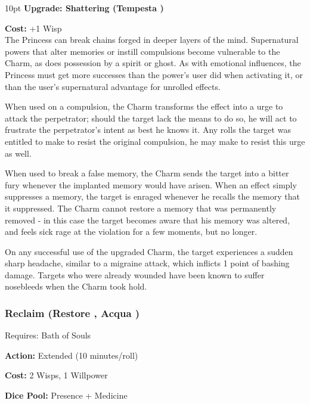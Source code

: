\begin{myindentpar}{10pt} \textbf{Upgrade: Shattering (Tempesta \textbullet\textbullet\textbullet\textbullet)}

\noindent \textbf{Cost:} +1 Wisp \\

\noindent The Princess can break chains forged in deeper layers of the mind. Supernatural powers that alter memories or instill compulsions become vulnerable to the Charm, as does possession by a spirit or ghost. As with emotional influences, the Princess must get more successes than the power's user did when activating it, or than the user's supernatural advantage for unrolled effects.

When used on a compulsion, the Charm transforms the effect into a urge to attack the perpetrator; should the target lack the means to do so, he will act to frustrate the perpetrator's intent as best he knows it. Any rolls the target was entitled to make to resist the original compulsion, he may make to resist this urge as well. 

When used to break a false memory, the Charm sends the target into a bitter fury whenever the implanted memory would have arisen. When an effect simply suppresses a memory, the target is enraged whenever he recalls the memory that it suppressed. The Charm cannot restore a memory that was permanently removed - in this case the target becomes aware that his memory was altered, and feels sick rage at the violation for a few moments, but no longer.

On any successful use of the upgraded Charm, the target experiences a sudden sharp headache, similar to a migraine attack, which inflicts 1 point of bashing damage. Targets who were already wounded have been known to suffer nosebleeds when the Charm took hold.\end{myindentpar}

\subsubsection*{Reclaim (Restore \textbullet\textbullet\textbullet\textbullet, Acqua \textbullet\textbullet\textbullet)}

\noindent Requires: Bath of Souls

\noindent \textbf{Action:} Extended (10 minutes/roll)

\noindent \textbf{Cost:} 2 Wisps, 1 Willpower

\noindent \textbf{Dice Pool:} Presence + Medicine 

